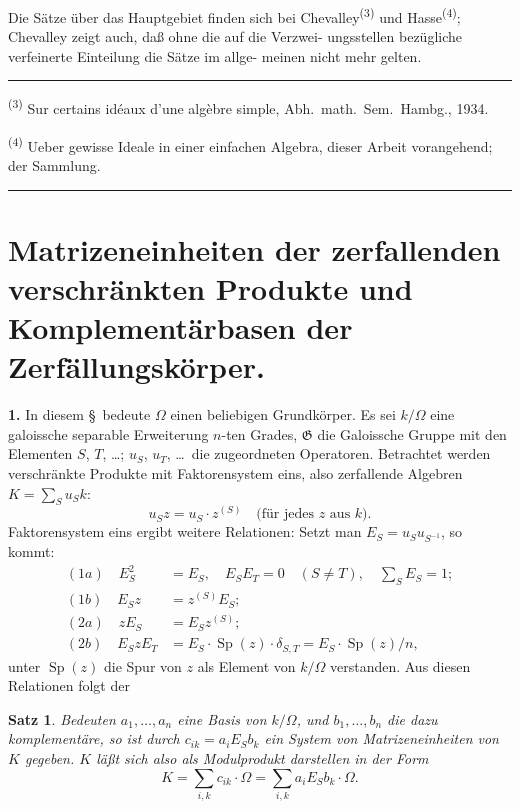 \documentclass[12pt,a4paper]{article}
\theoremstyle{plain}
\newtheorem*{satz}{Satz}
\newcommand{\Ga}{\mathfrak{G}}
\DeclareMathOperator{\Sp}{Sp}
\begin{document}
Die S\"atze \"uber das Hauptgebiet finden sich bei Chevalley\textsuperscript{(3)} und
Hasse\textsuperscript{(4)}; Chevalley zeigt auch, da\ss{} ohne die auf die Verzwei-
ungsstellen bez\"ugliche verfeinerte Einteilung die S\"atze im allge-
meinen nicht mehr gelten.

\bigskip
\noindent\rule{0.3\textwidth}{0.4pt}

{\small
\textsuperscript{(3)} Sur certains id\'eaux d'une alg\`ebre simple, Abh.\ math.\ Sem.\ Hambg., 1934.

\textsuperscript{(4)} Ueber gewisse Ideale in einer einfachen Algebra, dieser Arbeit vorangehend;
der Sammlung.
}

\vspace{0.5cm}
\noindent\rule{\textwidth}{0.4pt}
\vspace{0.5cm}

\section{Matrizeneinheiten der zerfallenden verschr\"ankten Produkte
und Komplement\"arbasen der Zerf\"allungsk\"orper.}
\label{sec:matrizeneinheiten}

\medskip
\noindent\textbf{1.}\hspace{0.5em}%
In diesem \S\ bedeute $\Omega$ einen beliebigen Grundk\"orper. Es
sei $k/\Omega$ eine galoissche separable Erweiterung $n$-ten Grades,
$\Ga$ die Galoissche Gruppe mit den Elementen $S$, $T$, \ldots; $u_S$, $u_T$, \ldots\
die zugeordneten Operatoren. Betrachtet werden verschr\"ankte
Produkte mit Faktorensystem eins, also zerfallende Algebren
$K = \sum_S u_S k$:
\begin{equation}\label{eq:zp1}
u_S z = u_S \cdot z^{(S)} \quad \text{(f\"ur jedes $z$ aus $k$).}
\end{equation}
Faktorensystem eins ergibt weitere Relationen: Setzt man
$E_S = u_S u_{S^{-1}}$, so kommt:
\begin{align}
(1a) \quad E_S^2 &= E_S, \quad E_S E_T = 0 \quad (S \neq T), \quad \sum_S E_S = 1; \\
(1b) \quad E_S z &= z^{(S)} E_S; \\
(2a) \quad z E_S &= E_S z^{(S)}; \\
(2b) \quad E_S z E_T &= E_S \cdot \Sp(z) \cdot \delta_{S,T} = E_S \cdot \Sp(z) / n,
\end{align}
unter $\Sp(z)$ die Spur von $z$ als Element von $k/\Omega$ verstanden. Aus
diesen Relationen folgt der

\begin{satz}
Bedeuten $a_1, \ldots, a_n$ eine Basis von $k/\Omega$, und $b_1, \ldots, b_n$
die dazu komplement\"are, so ist durch $c_{ik} = a_i E_S b_k$ ein System
von Matrizeneinheiten von $K$ gegeben. $K$ l\"a\ss t sich also als
Modulprodukt darstellen in der Form
\[
K = \sum_{i,k} c_{ik} \cdot \Omega = \sum_{i,k} a_i E_S b_k \cdot \Omega.
\]
\end{satz}
\end{document}
